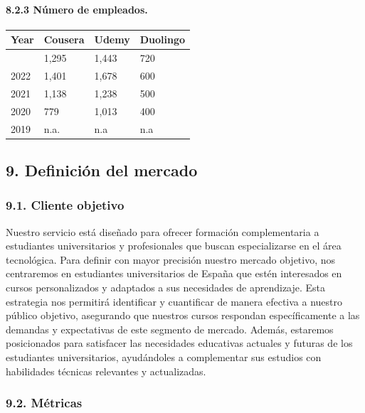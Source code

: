 \documentclass[
]{article}
\begin{document}
\newpage

\paragraph{8.2.3 Número de empleados.}\label{nuxfamero-de-empleados.}

\begin{longtable}[]{@{}llll@{}}
\toprule\noalign{}
Year & Cousera & Udemy & Duolingo \\
\midrule\noalign{}
\endhead
\bottomrule\noalign{}
\endlastfoot
2023 & 1,295 & 1,443 & 720 \\
2022 & 1,401 & 1,678 & 600 \\
2021 & 1,138 & 1,238 & 500 \\
2020 & 779 & 1,013 & 400 \\
2019 & n.a. & n.a & n.a \\
\end{longtable}

\newpage

\subsection{9. Definición del mercado}\label{definiciuxf3n-del-mercado}

\subsubsection{9.1. Cliente objetivo}\label{cliente-objetivo}

Nuestro servicio está diseñado para ofrecer formación complementaria a
estudiantes universitarios y profesionales que buscan especializarse en
el área tecnológica. Para definir con mayor precisión nuestro mercado
objetivo, nos centraremos en estudiantes universitarios de España que
estén interesados en cursos personalizados y adaptados a sus necesidades
de aprendizaje. Esta estrategia nos permitirá identificar y cuantificar
de manera efectiva a nuestro público objetivo, asegurando que nuestros
cursos respondan específicamente a las demandas y expectativas de este
segmento de mercado. Además, estaremos posicionados para satisfacer las
necesidades educativas actuales y futuras de los estudiantes
universitarios, ayudándoles a complementar sus estudios con habilidades
técnicas relevantes y actualizadas.

\subsubsection{9.2. Métricas}\label{muxe9tricas}
\end{document}

